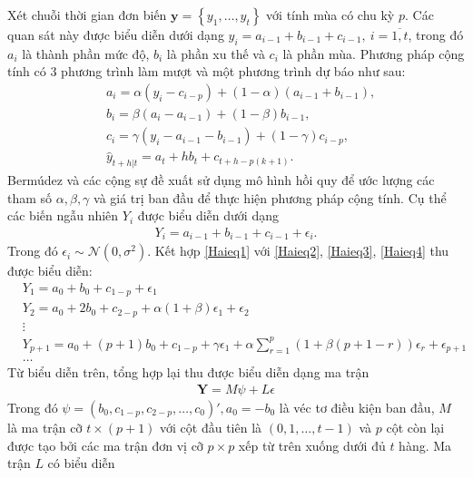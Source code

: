     Xét chuỗi thời gian đơn biến $\textbf{y} = \left\{y_1, \dots, y_t\right\}$ với tính mùa có chu kỳ $p$. Các quan sát này được biểu diễn dưới dạng $y_i = a_{i-1} + b_{i-1} + c_{i-1}, \ i= \overline{1, t}$, trong đó $a_i$ là thành phần mức độ, $b_i$ là phần xu thế và $c_i$ là phần mùa. Phương pháp cộng tính có $3$ phương trình làm mượt và một phương trình dự báo như sau:
    \begin{align} 
        &a_i = \alpha\left(y_i - c_{i-p}\right) + \left(1-\alpha\right)\left(a_{i-1} + b_{i-1}\right),\label{Haieq2} \\
        &b_i = \beta\left(a_i - a_{i-1}\right) + \left(1 - \beta\right)b_{i-1}, \label{Haieq3}\\
        &c_i = \gamma\left(y_i - a_{i-1} - b_{i-1}\right) + \left(1-\gamma\right)c_{i-p},\label{Haieq4} \\
        &\hat{y}_{t+h \vert t} = a_t + h b_t + c_{t+h - p\left(k+1\right)}.
    \end{align}
    Bermúdez và các cộng sự \cite{Ber2007} đề xuất sử dụng mô hình hồi quy để ước lượng các tham số $\alpha, \beta, \gamma$ và giá trị ban đầu để thực hiện phương pháp cộng tính. Cụ thể các biến ngẫu nhiên $Y_i$ được biểu diễn dưới dạng
    \begin{align}
        Y_i = a_{i-1} + b_{i-1} + c_{i-1} +  \epsilon_i. \label{Haieq1}
    \end{align}
    Trong đó $\epsilon_i \sim \mathcal{N}\left(0, \sigma^2\right)$. Kết hợp \eqref{Haieq1} với \eqref{Haieq2}, \eqref{Haieq3}, \eqref{Haieq4} thu được biểu diễn:
    \begin{align*}
        &Y_1 = a_0 + b_0 + c_{1-p} + \epsilon_1  \\
        &Y_2 = a_0 + 2b_0 + c_{2-p} + \alpha\left(1+\beta\right)\epsilon_1 +  \epsilon_2  \\
        & \vdots \\
        & Y_{p+1} = a_0 + \left(p + 1\right)b_0 + c_{1-p} + \gamma \epsilon_1 + \alpha \sum_{r= 1}^p \left(1 + \beta\left(p+1-r\right)\right)\epsilon_r + \epsilon_{p+1} \\
        &\dots
    \end{align*}
    Từ biểu diễn trên, tổng hợp lại thu được biểu diễn dạng ma trận
    \begin{align}
        \textbf{Y} = M \psi + L \epsilon         
    \end{align}
    Trong đó $\psi = \left(b_0, c_{1-p}, c_{2-p}, \dots, c_0\right)', a_0 = -b_0$ là véc tơ điều kiện ban đầu, $M$ là ma trận cỡ $t \times \left(p+1\right)$ với cột đầu tiên là $\left(0,1, \dots,t-1 \right)$ và $p$ cột còn lại được tạo bởi các ma trận đơn vị cỡ $p \times p$ xếp từ trên xuống dưới đủ $t$ hàng. Ma trận $L$ có biểu diễn
